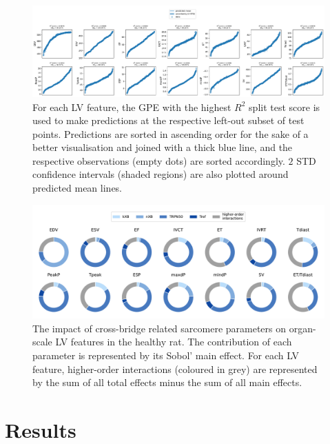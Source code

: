 \begin{figure}[!ht]
    \myfloatalign
    \includegraphics[width=\textwidth]{figures/chapter05/bgpes_vs_bsplit_om.pdf}
    \caption{For each LV feature, the GPE with the highest $R^2$ split test score is used to make predictions at the respective left-out subset of test points. Predictions are sorted in ascending order for the sake of a better visualisation and joined with a thick blue line, and the respective observations (empty dots) are sorted accordingly. $2$ STD confidence intervals (shaded regions) are also plotted around predicted mean lines.}
    \label{fig:omgpes}
\end{figure}


\begin{figure}[!ht]
    \myfloatalign
    \includegraphics[width=\textwidth]{figures/chapter05/gsa_om.pdf}
    \caption{The impact of cross-bridge related sarcomere parameters on organ-scale LV features in the healthy rat. The contribution of each parameter is represented by its Sobol' main effect. For each LV feature, higher-order interactions (coloured in grey) are represented by the sum of all total effects minus the sum of all main effects.}
    \label{fig:omgsa}
\end{figure}


%
%
%
\section{Results}\label{sec:ch5results}


%
%
%
